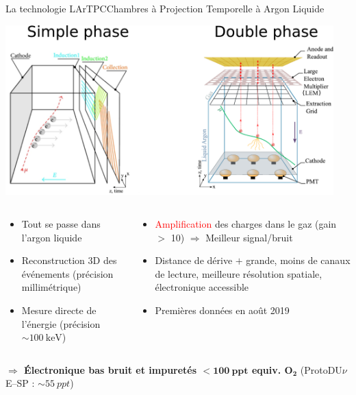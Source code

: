    \begin{frame}{La technologie LArTPC}{Chambres à Projection Temporelle à Argon Liquide}
       	\begin{scriptsize}
       			\centering\includegraphics[width=0.95\textwidth]{./pictures/tpcs.pdf}\\
       			\begin{columns}
       				\begin{column}{0.5\textwidth}
       					\begin{itemize}
           					\item Tout se passe dans l'argon liquide
       						\item Reconstruction 3D des événements (précision millimétrique)
       						\item Mesure directe de l'énergie (précision $\sim\SI{100}{\kilo\electronvolt}$)
       					\end{itemize}
       				\end{column}
       				\begin{column}{0.5\textwidth}
       					\begin{itemize}
       						\item \textcolor{red}{Amplification} des charges dans le gaz (gain $>$ 10) $\Rightarrow$ Meilleur signal/bruit
       						\item Distance de dérive $+$ grande, moins de canaux de lecture, meilleure résolution spatiale, électronique accessible
       						\item Premières données en août 2019
       					\end{itemize}
       				\end{column}
       			\end{columns}
       			\vfill
       			\textbf{$\Rightarrow$ Électronique bas bruit et impuretés $\mathbf{<\SI{100}{ppt}}$ equiv. $\mathbf{O_2}$} (ProtoDU$\nu$E--SP : $\sim\SI{55}{ppt}$)
       	\end{scriptsize}
    \end{frame}
    
